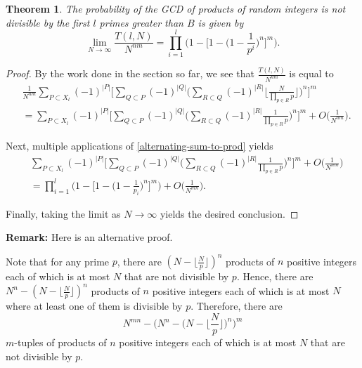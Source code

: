 \documentclass[10pt,a4paper]{article}
\newtheorem{theorem}{Theorem}[section]
\theoremstyle{definition}
\theoremstyle{remark}
\begin{document}
\begin{theorem} The probability of the GCD of products of random integers is not divisible by the first $l$ primes greater than $B$ is given by \label{probability-random-first-l}
$$\lim_{N\to\infty} \frac{T(l,N)}{N^{nm}} = \prod_{i=1}^{l} \Big(1 - \Big[1 - \Big(1-\frac{1}{p^i}\Big)^n\Big]^m\Big).$$
\end{theorem}

\begin{proof}
By the work done in the section so far, we see that $\displaystyle \frac{T(l,N)}{N^{nm}}$ is equal to 
 \begin{align}
&\frac{1}{N^{nm}}\sum_{P\subset X_l}{(-1)^{|P|}}\Big[\sum_{Q\subset P}(-1)^{|Q|}\Big(\sum_{R\subset Q}(-1)^{|R|}\Big\lfloor\frac{N}{\prod_{p\in R} p} \Big\rfloor\Big)^n\Big]^m\\
&= \sum_{P\subset X_l}{(-1)^{|P|}} \Big[\sum_{Q\subset P}(-1)^{|Q|} \Big(\sum_{R\subset Q}(-1)^{|R|} \frac{1}{\prod_{p\in R} p}\Big)^n\Big]^m+O\Big(\frac{1}{N^{nm}}\Big).
\end{align}

\noindent Next, multiple applications of \cref{alternating-sum-to-prod} yields
\begin{align}
&\sum_{P\subset X_l}{(-1)^{|P|}} \Big[\sum_{Q\subset P}(-1)^{|Q|} \Big(\sum_{R\subset Q}(-1)^{|R|}\frac{1}{\prod_{p\in R} p}\Big)^n \Big]^m + O\Big(\frac{1}{N^{nm}}\Big)\\ &= \prod_{i=1}^{l} \Big(1 - \Big[1 - \Big(1 - \frac{1}{p_i}\Big)^n\Big]^m \Big) + O\Big(\frac{1}{N^{mn}}\Big). 
\end{align}
	
\noindent Finally, taking the limit as $N \to \infty$ yields the desired conclusion.
\end{proof}

\noindent \textbf{Remark:} Here is an alternative proof. 

\vspace{.1 in}

\noindent Note that for any prime $p$, there are $(N - \lfloor\frac{N}{p}\rfloor)^n$ products of $n$ positive integers each of which is at most $N$ that are not divisible by $p$. Hence, there are $N^n - (N - \lfloor\frac{N}{p}\rfloor)^n$ products of $n$ positive integers each of which is at most $N$ where at least one of them is divisible by $p$. Therefore, there are 
$$N^{mn} - \Big(N^n - \Big(N - \Big\lfloor\frac{N}{p}\Big\rfloor\Big)^n\Big)^m$$
$m$-tuples of products of $n$ positive integers each of which is at most $N$ that are not divisible by $p$.
\end{document}
